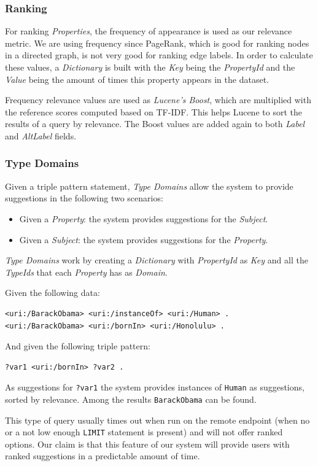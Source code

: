 \subsubsection{Ranking}
For ranking \textit{Properties}, the frequency of appearance is used as our relevance metric. 
We are using frequency since PageRank, which is good for ranking nodes in a directed graph, is not very good for ranking edge labels.
In order to calculate these values, a \textit{Dictionary} is built with the \textit{Key} being the \textit{PropertyId} and the \textit{Value} being the amount of times this property appears in the dataset.

Frequency relevance values are used as \textit{Lucene's Boost}, which are multiplied with the reference scores computed based on TF-IDF. This helps Lucene to sort the results of a query by relevance. The Boost values are added again to both \textit{Label} and \textit{AltLabel} fields.

\subsubsection{Type Domains}

Given a triple pattern statement, \textit{Type Domains} allow the system to provide suggestions in the following two scenarios:
\begin{itemize}
    \item Given a \textit{Property}: the system provides suggestions for the \textit{Subject}.
    \item Given a \textit{Subject}: the system provides suggestions for the \textit{Property}.
\end{itemize}

\textit{Type Domains} work by creating a \textit{Dictionary} with \textit{PropertyId} as \textit{Key} and all the \textit{TypeIds} that each \textit{Property} has as \textit{Domain}.

\begin{example}
Given the following data:
\begin{verbatim}
<uri:/BarackObama> <uri:/instanceOf> <uri:/Human> .
<uri:/BarackObama> <uri:/bornIn> <uri:/Honolulu> .
\end{verbatim}

And given the following triple pattern:
\begin{verbatim}
?var1 <uri:/bornIn> ?var2 .
\end{verbatim}

As suggestions for \texttt{?var1} the system provides instances of \texttt{Human} as suggestions, sorted by relevance. Among the results \texttt{BarackObama} can be found.

This type of query usually times out when run on the remote endpoint (when no or a not low enough \texttt{LIMIT} statement is present) and will not offer ranked options. Our claim is that this feature of our system will provide users with ranked suggestions in a predictable amount of time.
\end{example}

